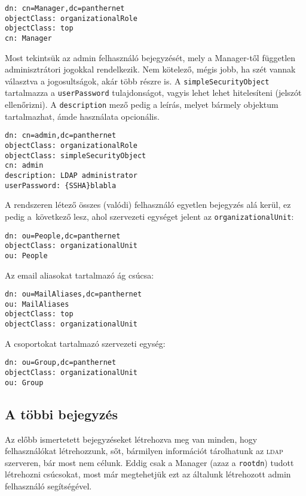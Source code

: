 \begin{Verbatim}[frame=single]
dn: cn=Manager,dc=panthernet
objectClass: organizationalRole
objectClass: top
cn: Manager
\end{Verbatim}

\noindent Most tekintsük az admin felhasználó bejegyzését, mely a Manager-től független adminisztrátori jogokkal
rendelkezik. Nem kötelező, mégis jobb, ha szét vannak választva a jogosultságok, akár több részre is. A
\texttt{simpleSecurityObject} tartalmazza a \texttt{userPassword} tulajdonságot, vagyis lehet lehet hitelesíteni
(jelszót ellenőrizni). A \texttt{description} mező pedig a leírás, melyet bármely objektum tartalmazhat, ámde használata
opcionális.


\begin{Verbatim}[frame=single]
dn: cn=admin,dc=panthernet
objectClass: organizationalRole
objectClass: simpleSecurityObject
cn: admin
description: LDAP administrator
userPassword: {SSHA}blabla
\end{Verbatim}


\noindent A rendszeren létező összes (valódi) felhasználó egyetlen bejegyzés alá kerül, ez pedig a~következő lesz, ahol
szervezeti egységet jelent az \texttt{organizationalUnit}:

\begin{Verbatim}[frame=single]
dn: ou=People,dc=panthernet
objectClass: organizationalUnit
ou: People  
\end{Verbatim}


\noindent Az email aliasokat tartalmazó ág csúcsa:

\begin{Verbatim}[frame=single]
dn: ou=MailAliases,dc=panthernet
ou: MailAliases
objectClass: top
objectClass: organizationalUnit
\end{Verbatim}


\noindent A csoportokat tartalmazó szervezeti egység:

\begin{Verbatim}[frame=single]
dn: ou=Group,dc=panthernet
objectClass: organizationalUnit
ou: Group
\end{Verbatim}



\subsection{A többi bejegyzés}
Az előbb ismertetett bejegyzéseket létrehozva meg van minden, hogy felhasználókat létrehozzunk, sőt, bármilyen
információt tárolhatunk az \textsc{ldap} szerveren, bár most nem célunk. Eddig csak a Manager (azaz a \texttt{rootdn}) tudott
létrehozni csúcsokat, most már megtehetjük ezt az általunk létrehozott admin felhasználó segítségével.



